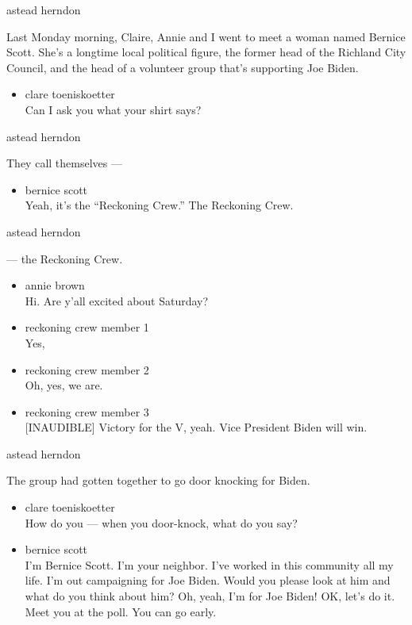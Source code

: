 astead herndon

Last Monday morning, Claire, Annie and I went to meet a woman named
Bernice Scott. She's a longtime local political figure, the former head
of the Richland City Council, and the head of a volunteer group that's
supporting Joe Biden.

\begin{itemize}
\tightlist
\item
  clare toeniskoetter\\
  Can I ask you what your shirt says?
\end{itemize}

astead herndon

They call themselves ---

\begin{itemize}
\tightlist
\item
  bernice scott\\
  Yeah, it's the ``Reckoning Crew.'' The Reckoning Crew.
\end{itemize}

astead herndon

--- the Reckoning Crew.

\begin{itemize}
\item
  annie brown\\
  Hi. Are y'all excited about Saturday?
\item
  reckoning crew member 1\\
  Yes,
\item
  reckoning crew member 2\\
  Oh, yes, we are.
\item
  reckoning crew member 3\\
  {[}INAUDIBLE{]} Victory for the V, yeah. Vice President Biden will
  win.
\end{itemize}

astead herndon

The group had gotten together to go door knocking for Biden.

\begin{itemize}
\item
  clare toeniskoetter\\
  How do you --- when you door-knock, what do you say?
\item
  bernice scott\\
  I'm Bernice Scott. I'm your neighbor. I've worked in this community
  all my life. I'm out campaigning for Joe Biden. Would you please look
  at him and what do you think about him? Oh, yeah, I'm for Joe Biden!
  OK, let's do it. Meet you at the poll. You can go early.
\end{itemize}

